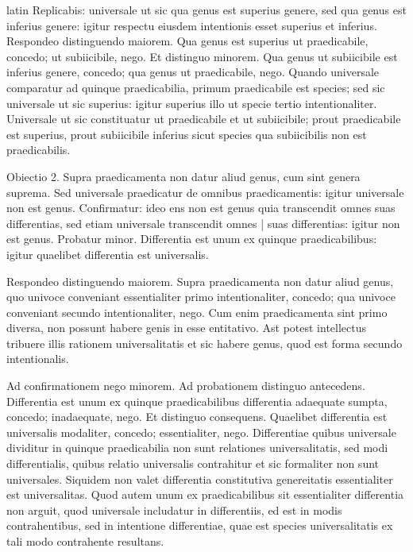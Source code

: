 \begin{otherlanguage*}{latin}
\pstart
  Replicabis: universale ut sic qua genus est superius genere, sed qua genus est inferius genere: igitur respectu eiusdem intentionis esset superius et inferius. Respondeo distinguendo maiorem. Qua genus est superius ut praedicabile, concedo; ut subiicibile, nego. Et distinguo minorem. Qua genus ut subiicibile est inferius genere, concedo; qua genus ut praedicabile, nego. Quando universale comparatur ad quinque praedicabilia, primum praedicabile est species; sed sic universale ut sic superius: igitur superius illo ut specie tertio intentionaliter. Universale ut sic constituatur ut praedicabile et ut subiicibile; prout praedicabile est superius, prout subiicibile inferius sicut species qua subiicibilis non est praedicabilis. 
\pend

\pstart
  Obiectio 2. Supra praedicamenta non datur aliud genus, cum sint genera suprema. Sed universale praedicatur de omnibus praedicamentis: igitur universale non est genus. Confirmatur: ideo ens non est genus quia transcendit omnes suas differentias, sed etiam universale transcendit omnes \textnormal{|}   suas differentias: igitur non est genus. Probatur minor. Differentia est unum ex quinque praedicabilibus: igitur quaelibet differentia est universalis. 
\pend

\pstart
  Respondeo distinguendo maiorem. Supra praedicamenta non datur aliud genus, quo univoce conveniant essentialiter primo intentionaliter, concedo; qua univoce conveniant secundo intentionaliter, nego. Cum enim praedicamenta sint primo diversa, non possunt habere genis in esse entitativo. Ast potest intellectus tribuere illis rationem universalitatis et sic habere genus, quod est forma secundo intentionalis. 
\pend

\pstart
  Ad confirmationem nego minorem. Ad probationem distinguo antecedens. Differentia est unum ex quinque praedicabilibus differentia adaequate sumpta, concedo; inadaequate, nego. Et distinguo consequens. Quaelibet differentia est universalis modaliter, concedo; essentialiter, nego. Differentiae quibus universale dividitur in quinque praedicabilia non sunt relationes universalitatis, sed modi differentialis, quibus relatio universalis contrahitur et sic formaliter non sunt universales. Siquidem non valet differentia constitutiva genereitatis essentialiter est universalitas. Quod autem unum ex praedicabilibus sit essentialiter differentia non arguit, quod universale includatur in differentiis, ed est in modis contrahentibus, sed in intentione differentiae, quae est species universalitatis ex tali modo contrahente resultans. 
\pend


\end{otherlanguage*}
